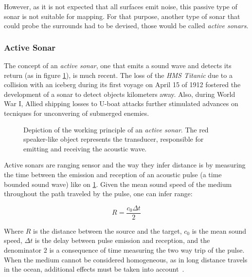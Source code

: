 However, as it is not expected that all surfaces emit noise, this passive type
of sonar is not suitable for mapping.
For that purpose, another type of sonar that could probe the surrounds had to be
devised, those would be called \textit{active sonars}.


\subsubsection{Active Sonar}

The concept of an \textit{active sonar}, one that emits a sound wave and detects
its return (as in figure \ref{fig:sonar_principle}), is much recent. The
loss of the \textit{HMS Titanic} due to a collision with an iceberg during its
first voyage on April 15 of 1912 \cite{histsonar} fostered the development of a sonar
to detect objects kilometers away. Also, during World War I,
Allied shipping losses to U-boat attacks further stimulated advances on tecniques for
unconvering of submerged enemies.

\begin{figure}
	\centering
	
	\caption{Depiction of the working principle of an \textit{active sonar}. The
	red speaker-like object represents the transducer, responsible for
	emitting and receiving the acoustic wave.}
	\label{fig:sonar_principle}
\end{figure}

Active sonars are ranging sensor and the way they infer distance is by measuring
the time between the emission and reception of an acoustic pulse (a time bounded
sound wave) like on \ref{fig:sonar_principle}. Given the mean sound speed of the
medium throughout the path traveled by the pulse, one can infer range\cite{LURTON}:

\begin{equation}
R = \frac{c_0 \Delta t}{2}
\label{eq:delaytodistance}
\end{equation}


Where $R$ is the distance between the source and the target, $c_0$ is the mean
sound speed, $\Delta t$ is the delay between pulse emission and reception, and
the denominator $2$ is a consequence of time measuring the two way
trip of the pulse. When the medium cannot be considered homogeneous, as in long distance travels in
the ocean, additional effects must be taken into account~\cite{Etter2013}.

